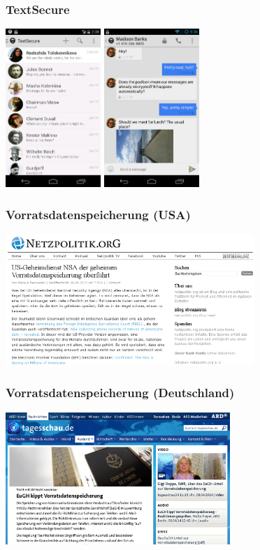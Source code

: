 \documentclass[12pt]{beamer}
\begin{document}
\begin{frame}
  \frametitle{TextSecure}
    \begin{center}
      \includegraphics[height=6cm]{img/textsecure1.png}
      \hspace{0.5cm}
      \includegraphics[height=6cm]{img/textsecure2.png}
    \end{center}
\end{frame}

\begin{frame}
  \frametitle{Vorratsdatenspeicherung (USA)}
    \begin{center}
      \includegraphics[height=5cm]{img/netzpolitik-verizon.png}
    \end{center}
\end{frame}

\begin{frame}
  \frametitle{Vorratsdatenspeicherung (Deutschland)}
    \begin{center}
      \includegraphics[height=5cm]{img/tagesschau-vds.png}
    \end{center}
\end{frame}
\end{document}
